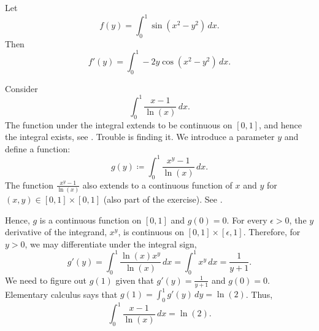 \begin{example}
Let
\begin{equation*}
f(y) = \int_0^1 \sin(x^2-y^2) \,dx .
\end{equation*}
Then
\begin{equation*}
f'(y) = \int_0^1 -2y\cos(x^2-y^2) \,dx .
\end{equation*}
\end{example}

\begin{example} \label{example:counterexamplediffunder}
Consider
\begin{equation*}
\int_0^{1} \frac{x-1}{\ln(x)} \,dx .
\end{equation*}
The function under the integral 
extends to be continuous on $[0,1]$, and hence
the integral exists, see .  Trouble is finding it.
We introduce a parameter $y$
and define a function:
\begin{equation*}
g(y) \coloneqq \int_0^{1} \frac{x^y-1}{\ln(x)} \,dx .
\end{equation*}
The function
$\frac{x^y-1}{\ln(x)}$
also extends to a continuous function of $x$ and $y$
for $(x,y) \in [0,1] \times [0,1]$ (also part of the exercise).
See .
\begin{myfigureht}
\caption{The graph $z= \frac{x^y-1}{\ln(x)}$ on $[0,1] \times [0,1]$.\label{fig:diffunderexample}}
\end{myfigureht}


Hence,
$g$ is a continuous function on $[0,1]$ and $g(0) = 0$.
For every $\epsilon > 0$, the $y$ derivative of the integrand, $x^y$,
is continuous on $[0,1] \times [\epsilon,1]$.  Therefore,
for $y >0$, we may differentiate under the integral sign,
\begin{equation*}
g'(y) =
\int_0^{1} \frac{\ln(x) x^y}{\ln(x)} \,dx 
=
\int_0^{1} x^y \,dx =
\frac{1}{y+1} .
\end{equation*}
We need to figure out $g(1)$ given that $g'(y) = \frac{1}{y+1}$ and $g(0) =
0$.  Elementary calculus says that $g(1) = \int_0^1 g'(y)\,dy = \ln(2)$.
Thus,
\begin{equation*}
\int_0^{1} \frac{x-1}{\ln(x)} \,dx  = \ln(2).
\end{equation*}
\end{example}

